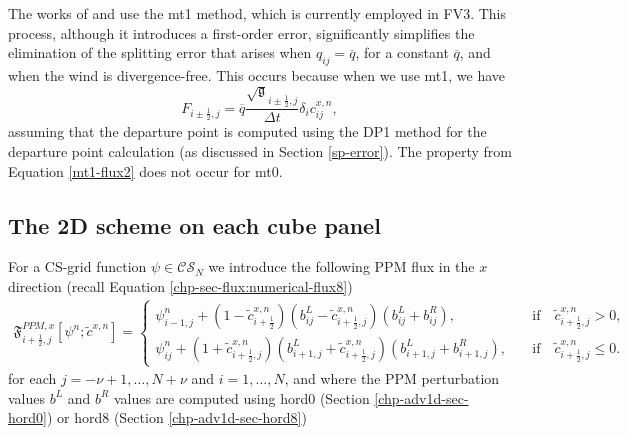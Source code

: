 The works of \citet{lin:2004} and \citet{putman:2007} use the mt1 method, which is currently employed in FV3.
This process, although it introduces a first-order error, 
significantly simplifies the elimination of the splitting error that arises when $q_{ij} = \overline{q}$, for a constant $\overline{q}$, 
and when the wind is divergence-free.
This occurs because when we use mt1, we have
\begin{equation}
	\label{mt1-flux2}
	{F}_{i\pm\frac{1}{2},j} =  \overline{q}\frac{\sqrt{\mathfrak{g}}_{i\pm\frac{1}{2},j}}{\Delta t}
	\delta_i c^{x,n}_{ij},
\end{equation}
assuming that the departure point is computed using the DP1 method for the departure point calculation (as discussed in Section \ref{sp-error}).
The property from Equation \eqref{mt1-flux2} does not occur for mt0.

\subsection{The 2D scheme on each cube panel}
\label{sec-splittingcs}
For a CS-grid function $\psi \in \mathcal{CS}_N$
we introduce the following PPM flux in the $x$ direction (recall Equation \eqref{chp-sec-flux:numerical-flux8})
\begin{align}
	\mathfrak{F}_{i+\frac{1}{2},j}^{PPM,x} [{{\psi}^n;\tilde{c}^{x,n}}]= %
	\begin{cases}
		{\psi}_{i-1,j}^{n}+(1-\tilde{c}_{i+\frac{1}{2}}^{x,n})
		(b^L_{ij}-\tilde{c}_{i+\frac{1}{2},j}^{x,n})
		(b^L_{ij}+b^R_{ij}),
		\quad &\text{if} \quad \tilde{c}_{i+\frac{1}{2},j}^{x,n}>0,\\
		{\psi}_{ij}^{n}+(1+\tilde{c}_{i+\frac{1}{2},j}^{x,n})
		(b^L_{i+1,j}+\tilde{c}_{i+\frac{1}{2},j}^{x,n})
		(b^L_{i+1,j}+b^R_{i+1,j}),
		\quad &\text{if} \quad \tilde{c}_{i+\frac{1}{2},j}^{x,n}\leq0.
	\end{cases}
\end{align}
for each $j=-\nu+1, \ldots, N+\nu$ and $i=1, \ldots, N$, and
where the PPM perturbation values $b^L$ and $b^R$ values are computed using hord0 (Section \ref{chp-adv1d-sec-hord0}) or hord8 (Section \ref{chp-adv1d-sec-hord8})

